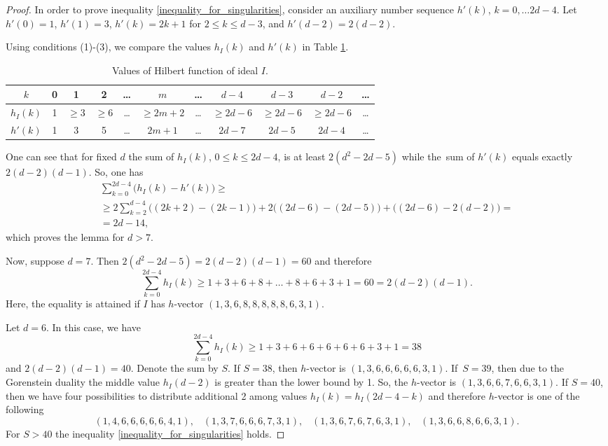 \documentclass[10pt,a4paper]{amsart}
\begin{document}
\begin{proof}
	In order to prove inequality \eqref{inequality_for_singularities}, consider an auxiliary number sequence $h'(k)$, $k=0,\dots 2d-4$. Let $h'(0)=1$, $h'(1)=3$, $h'(k)=2k+1$ for $2\leqslant k \leqslant d-3$, and $h'(d-2)=2(d-2)$.
	

	Using conditions (1)-(3), we compare the values $h_I(k)$ and $h'(k)$ in Table \ref{table}.
	
	\begin{table}[h!]
	\centering
		\begin{tabular}{| c | c | c | c | c | c | c | c | c | c | c |}\hline 
		$k$ & 0 & 1 & 2  & \dots & $m$ & \dots & $d-4$ & $d-3$ & $d-2$ & \dots \\ \hline
		$h_I(k)$ & 1 & $\geqslant 3$ & $\geqslant 6$ & \dots & $\geqslant 2m+2$ & \dots & $\geqslant 2d-6$ &  $\geqslant 2d-6$ & $\geqslant 2d-6$ & \dots   \\ \hline
		$h'(k)$ & 1 & 3 & 5 & \dots & $2m+1$ & \dots & $2d-7$ & $2d-5$ & $2d-4$ & \dots \\ \hline
	\end{tabular}
	\caption{Values of Hilbert function of ideal $I$.}
	\label{table}
	\end{table}
	One can see that for fixed $d$ the sum of $h_I(k)$, $0\leqslant k\leqslant 2d-4$, is at least $2(d^2-2d-5)$ while the~sum of $h'(k)$ equals exactly $2(d-2)(d-1)$. So, one has 
		\begin{multline*}
		\sum\limits_{k=0}^{2d-4}\bigg(h_I(k)-h'(k)\bigg)\geqslant  \\
		\geqslant 2\sum\limits_{k=2}^{d-4}\bigg((2k+2)-(2k-1)\bigg)+ 2 \bigg( (2d-6) -(2d-5)\bigg) +\bigg((2d-6)-2(d-2)\bigg)=\\
		=2d-14,
	\end{multline*}
	which proves the lemma for $d>7$. 
	
	Now, suppose $d=7$. Then $2(d^2-2d-5)=2(d-2)(d-1)=60$ and therefore
	$$\sum\limits_{k=0}^{2d-4}h_I(k)\geqslant 1+3+6+8+\dots+8+6+3+1=60= 2(d-2)(d-1).$$ Here, the equality is attained if $I$ has $h$-vector $(1,3,6,8,8,8,8,8,6,3,1)$. 
	
	Let $d=6$. In this case, we have 
	$$\sum\limits_{k=0}^{2d-4}h_I(k)\geqslant 1+3+6+6+6+6+6+3+1= 38$$
	and $2(d-2)(d-1)=40$. Denote the sum by $S$. If $S=38$, then $h$-vector is $(1,3,6,6,6,6,6,3,1)$. \mbox{If $S=39$,} then due to the Gorenstein duality the middle value $h_I(d-2)$ is greater than the lower bound by 1. So, the $h$-vector is $(1,3,6,6,7,6,6,3,1)$. If $S=40$, then we have four possibilities to distribute additional 2 among values $h_I(k)=h_I(2d-4-k)$ and therefore $h$-vector is one of the following
	$$(1,4,6,6,6,6,6,4,1), \hspace{10pt}(1,3,7,6,6,6,7,3,1), \hspace{10pt} (1,3,6,7,6,7,6,3,1), \hspace{10pt} (1,3,6,6,8,6,6,3,1).$$
	For $S>40$ the inequality \eqref{inequality_for_singularities} holds.

\end{proof}
\end{document}
